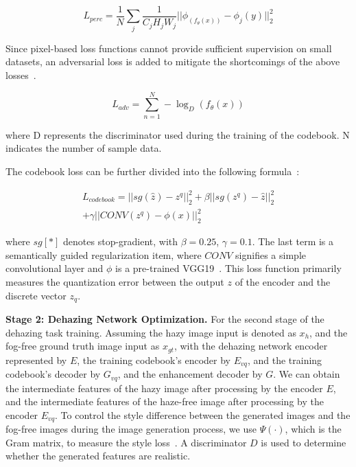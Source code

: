 \documentclass[journal]{IEEEtran}
\begin{document}
\begin{equation}
	\label{perceptual_loss}
	L_ {perc} = \frac{1}{N} \sum_{j} \frac{1}{C_{j}H_{j}W_{j}} || \phi_(f_{\theta}(x)) - \phi_{j}(y)||_{2}^{2}
\end{equation}

Since pixel-based loss functions cannot provide sufficient supervision on small datasets, an adversarial loss is added to mitigate the shortcomings of the above losses~\cite{zhu2017unpaired}.

\begin{equation}
	\label{adversarial_loss}
	L_{adv} = \sum_{n=1}^{N} - \log_{D} (f_{\theta}(x))
\end{equation}

\noindent where D represents the discriminator used during the training of the codebook. N indicates the number of sample data.


The codebook loss can be further divided into the following formula~\cite{chen2022real}:

\begin{equation}
	\label{codebook_loss}
	\begin{split}
		L_ {codebook} = || sg(\widehat{z}) - z^ {q} ||_{2}^{2} + \beta ||sg(z^{q})- \widehat{z}||_{2}^{2} \\
		+ \gamma ||CONV(z^{q}) - \phi(x)||_{2}^{2}
	\end{split}
\end{equation}

\noindent where $sg[*]$ denotes stop-gradient, with $\beta = 0.25$, $\gamma = 0.1$. The last term is a semantically guided regularization item, where $CONV$ signifies a simple convolutional layer and $\phi$ is a pre-trained VGG19~\cite{simonyan2014very}. This loss function primarily measures the quantization error between the output $z$ of the encoder and the discrete vector $z_{q}$.

	{\bf{Stage 2: Dehazing Network Optimization.}} For the second stage of the dehazing task training. Assuming the hazy image input is denoted as $x_h$, and the fog-free ground truth image input as $x_{gt}$, with the dehazing network encoder represented by $E$, the training codebook's encoder by $E_{vq}$, and the training codebook's decoder by $G_{vq}$, and the enhancement decoder by $G$. We can obtain the intermediate features of the hazy image after processing by the encoder $E$, and the intermediate features of the haze-free image after processing by the encoder $E_{vq}$. To control the style difference between the generated images and the fog-free images during the image generation process, we use $\Psi(\cdot)$, which is the Gram matrix, to measure the style loss~\cite{gondal2019unreasonable}. A discriminator $D$ is used to determine whether the generated features are realistic.
\end{document}
